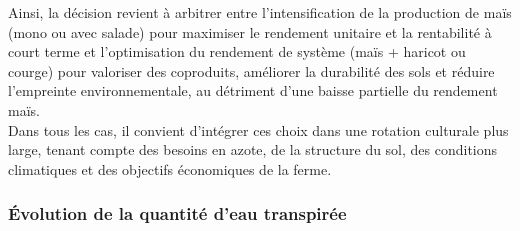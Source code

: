 \documentclass[
]{article}
\begin{document}
Ainsi, la décision revient à arbitrer entre l'intensification de la
production de maïs (mono ou avec salade) pour maximiser le rendement
unitaire et la rentabilité à court terme et l'optimisation du rendement
de système (maïs + haricot ou courge) pour valoriser des coproduits,
améliorer la durabilité des sols et réduire l'empreinte
environnementale, au détriment d'une baisse partielle du rendement
maïs.\\
Dans tous les cas, il convient d'intégrer ces choix dans une rotation
culturale plus large, tenant compte des besoins en azote, de la
structure du sol, des conditions climatiques et des objectifs
économiques de la ferme.

\subsubsection{Évolution de la quantité d'eau
transpirée}\label{uxe9volution-de-la-quantituxe9-deau-transpiruxe9e}
\end{document}
